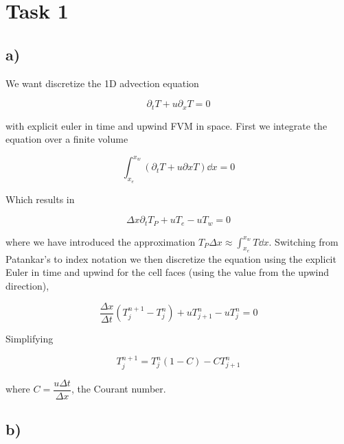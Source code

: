 \documentclass{article}
\begin{document}

\section{Task 1}

\subsection{a)}
We want discretize the 1D advection equation 

\begin{equation}
 	\partial_t T + u \partial_x T = 0	
\end{equation}

with explicit euler in time and upwind FVM in space. First we integrate the equation over a finite volume

\begin{equation}
 	\int_{x_e}^{x_w} (\partial_t T + u \partial x T )\dd{x} = 0
\end{equation}

Which results in 

\begin{equation}
\Delta x \partial_t T_P + uT_e - uT_w = 0
\end{equation}

where we have introduced the approximation $T_P \Delta x  \approx \int_{x_e}^{x_w} T\dd{x}$. Switching from Patankar's to index notation we then discretize the equation using the explicit Euler in time and upwind for the cell faces (using the value from the upwind direction),

\begin{equation}
	\label{eq:upwind0}
	\frac{\Delta x}{\Delta t} (T_j^{n+1} - T_j^n) + u T^n_{j+1} - uT^n_j = 0
\end{equation}

Simplifying

\begin{equation}
	\label{eq:upwind}
 	T_j^{n+1} = T_j^n(1 - C) -C T^n_{j+1}
\end{equation}

where $C = \dfrac{u\Delta t}{\Delta x}$, the Courant number.

\subsection*{b)}
\end{document}
